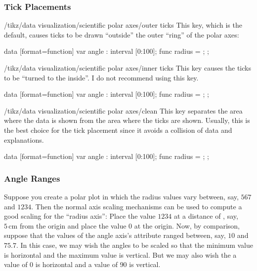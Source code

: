 \subsubsection{Tick Placements}

\begin{key}{/tikz/data visualization/scientific polar axes/outer ticks}
    This key, which is the default, causes ticks to be drawn ``outside'' the
    outer ``ring'' of the polar axes:
\begin{codeexample}[width=8.8cm]
\tikz \datavisualization [
  scientific polar axes={outer ticks, 0 to 180},
  visualize as smooth line]
data [format=function] {
  var  angle : interval [0:100];
  func radius = \value{angle};
};
\end{codeexample}
\end{key}

\begin{key}{/tikz/data visualization/scientific polar axes/inner ticks}
    This key causes the ticks to be ``turned to the inside''. I do not
    recommend using this key.
\begin{codeexample}[width=8.8cm]
\tikz \datavisualization [
  scientific polar axes={inner ticks, 0 to 180},
  visualize as smooth line]
data [format=function] {
  var  angle : interval [0:100];
  func radius = \value{angle};
};
\end{codeexample}
\end{key}

\begin{key}{/tikz/data visualization/scientific polar axes/clean}
    This key separates the area where the data is shown from the area where the
    ticks are shown. Usually, this is the best choice for the tick placement
    since it avoids a collision of data and explanations.
\begin{codeexample}[width=8.8cm]
\tikz \datavisualization [
  scientific polar axes={clean, 0 to 180},
  visualize as smooth line]
data [format=function] {
  var  angle : interval [0:100];
  func radius = \value{angle};
};
\end{codeexample}
\end{key}


\subsubsection{Angle Ranges}
\label{section-dv-angle-ranges}

Suppose you create a polar plot in which the radius values vary between, say,
$567$ and $1234$. Then the normal axis scaling mechanisms can be used to
compute a good scaling for the ``radius axis'': Place the value $1234$ at a
distance of , say, $5\,\mathrm{cm}$ from the origin and place the value $0$ at
the origin. Now, by comparison, suppose that the values of the angle axis's
attribute ranged between, say, $10$ and $75.7$. In this case, we may wish the
angles to be scaled so that the minimum value is horizontal and the maximum
value is vertical. But we may also wish the a value of $0$ is horizontal and a
value of $90$ is vertical.

